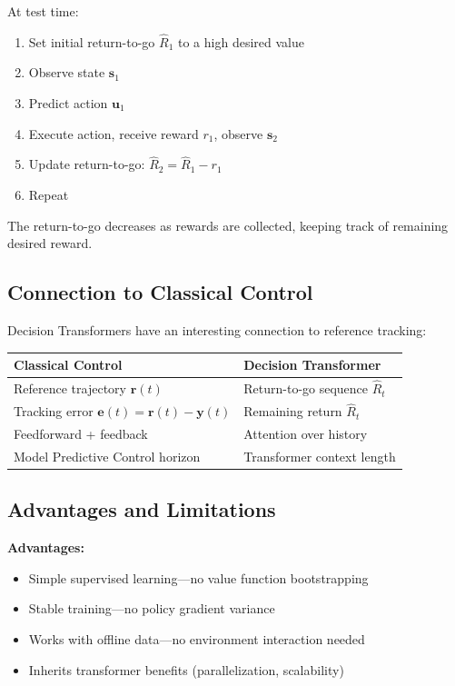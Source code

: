 At test time:
\begin{enumerate}
    \item Set initial return-to-go $\hat{R}_1$ to a high desired value
    \item Observe state $\mathbf{s}_1$
    \item Predict action $\mathbf{u}_1$
    \item Execute action, receive reward $r_1$, observe $\mathbf{s}_2$
    \item Update return-to-go: $\hat{R}_2 = \hat{R}_1 - r_1$
    \item Repeat
\end{enumerate}

The return-to-go decreases as rewards are collected, keeping track of remaining desired reward.

\subsection{Connection to Classical Control}

Decision Transformers have an interesting connection to reference tracking:

\begin{center}
\begin{tabular}{ll}
\toprule
\textbf{Classical Control} & \textbf{Decision Transformer} \\
\midrule
Reference trajectory $\mathbf{r}(t)$ & Return-to-go sequence $\hat{R}_t$ \\
Tracking error $\mathbf{e}(t) = \mathbf{r}(t) - \mathbf{y}(t)$ & Remaining return $\hat{R}_t$ \\
Feedforward + feedback & Attention over history \\
Model Predictive Control horizon & Transformer context length \\
\bottomrule
\end{tabular}
\end{center}

\subsection{Advantages and Limitations}

\textbf{Advantages:}
\begin{itemize}
    \item Simple supervised learning---no value function bootstrapping
    \item Stable training---no policy gradient variance
    \item Works with offline data---no environment interaction needed
    \item Inherits transformer benefits (parallelization, scalability)
\end{itemize}

